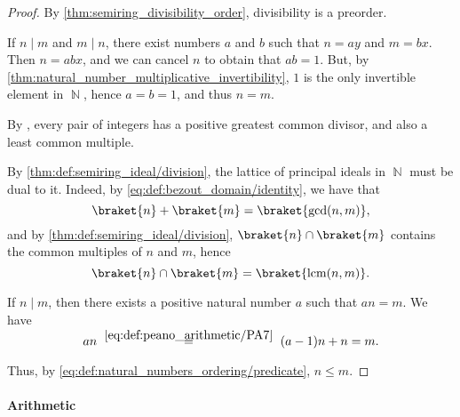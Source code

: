 \begin{proof}
  By \cref{thm:semiring_divisibility_order}, divisibility is a preorder.

   If \( n \mid m \) and \( m \mid n \), there exist numbers \( a \) and \( b \) such that \( n = ay \) and \( m = bx \). Then \( n = abx \), and we can cancel \( n \) to obtain that \( ab = 1 \). But, by \cref{thm:natural_number_multiplicative_invertibility}, \( 1 \) is the only invertible element in \( \BbbN \), hence \( a = b = 1 \), and thus \( n = m \).

   By , every pair of integers has a positive greatest common divisor, and also a least common multiple.

  By \cref{thm:def:semiring_ideal/division}, the lattice of principal ideals in \( \BbbN \) must be dual to it. Indeed, by \eqref{eq:def:bezout_domain/identity}, we have that
  \begin{equation*}
    \braket{n} + \braket{m} = \braket{ \gcd(n, m) },
  \end{equation*}
  and by \cref{thm:def:semiring_ideal/division}, \( \braket{n} \cap \braket{m} \) contains the common multiples of \( n \) and \( m \), hence
  \begin{equation*}
    \braket{n} \cap \braket{m} = \braket{ \lcm(n, m) }.
  \end{equation*}

   If \( n \mid m \), then there exists a positive natural number \( a \) such that \( an = m \). We have
  \begin{equation*}
    an
    \reloset{\eqref{eq:def:peano_arithmetic/PA7}} =
    (a - 1)n + n
    =
    m.
  \end{equation*}

  Thus, by \eqref{eq:def:natural_numbers_ordering/predicate}, \( n \leq m \).
\end{proof}

\paragraph{Arithmetic}

